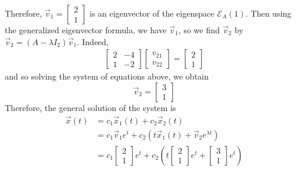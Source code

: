 \documentclass[11pt]{article}
\theoremstyle{definition}\newtheorem{definition}{Definition}
\theoremstyle{definition}\newtheorem{notation}{Notation}
\theoremstyle{definition}\newtheorem{example}{Example}
\theoremstyle{theorem}\newtheorem{theorem}{Theorem}
\theoremstyle{theorem}\newtheorem{corollary}{Corollary}
\theoremstyle{theorem}\newtheorem{proposition}{Proposition}
\theoremstyle{theorem}\newtheorem{lemma}{Lemma}
\theoremstyle{theorem}\newtheorem{question}{Question}
\theoremstyle{remark}\newtheorem{remark}{Remark}
\newcommand{\E}{\mathcal{E}}
\begin{document}
Therefore, $\vec{v}_1 = \begin{bmatrix} 2 \\ 1 \end{bmatrix}$ is an eigenvector of the eigenspace $\E_A(1)$. Then using the generalized eigenvector formula, we have $\vec{v}_1$, so we find $\vec{v}_2$ by $\vec{v}_2 = (A - \lambda I_2)\vec{v}_1$. Indeed,
\begin{align*}
    \begin{bmatrix} 
        2 & -4 \\
        1 & -2
    \end{bmatrix} \begin{bmatrix} v_{21} \\ v_{22} \end{bmatrix} = \begin{bmatrix} 2 \\ 1 \end{bmatrix}
\end{align*}
and so solving the system of equations above, we obtain
\begin{equation*}
    \vec{v}_2 = \begin{bmatrix} 3 \\ 1 \end{bmatrix}
\end{equation*}
Therefore, the general solution of the system is
\begin{align*}
    \vec{x}(t) &= c_1\vec{x}_1(t) + c_2\vec{x}_2(t) \\
    &= c_1\vec{v}_1e^{t} + c_2(t\vec{x}_1(t) + \vec{v}_2e^{\lambda t}) \\
    &= c_1\begin{bmatrix} 2 \\ 1 \end{bmatrix} e^t  + c_2\left(t\begin{bmatrix} 2 \\ 1 \end{bmatrix} e^t + \begin{bmatrix} 3 \\ 1 \end{bmatrix} e^t\right)
\end{align*}
\end{document}
